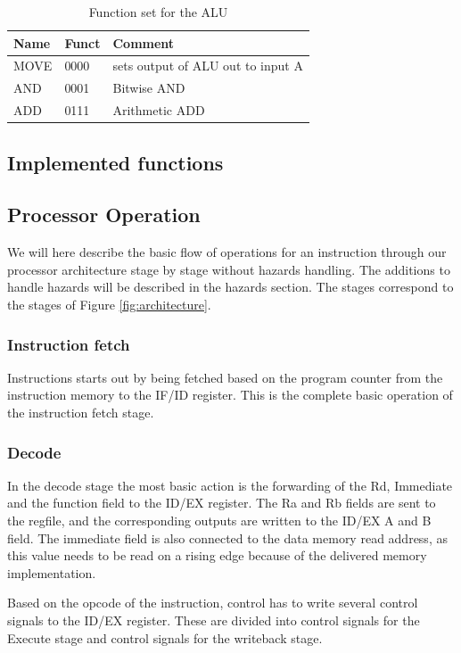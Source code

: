 \documentclass[11pt]{report}
\begin{document}
\begin{table}[h]
  \centering
  \begin{tabular}{|l|l|l|}
    \hline
    Name&Funct&Comment \\
    \hline
    MOVE	&0000	& sets output of ALU out to input A\\
    AND		&0001	& Bitwise AND\\
    ADD		&0111	& Arithmetic ADD\\
    \hline
  \end{tabular}
  \caption{Function set for the ALU}
\end{table}


\subsection*{Implemented functions}
\subsection*{Processor Operation}
We will here describe the basic flow of operations for an instruction
through our processor architecture stage by stage without hazards handling.
The additions to handle hazards will be described in the hazards section.
The stages correspond to the stages of Figure \ref{fig:architecture}.

\subsubsection*{Instruction fetch}


Instructions starts out by being fetched based on the program counter from the
instruction memory to the IF/ID register. This is the complete basic operation of the 
instruction fetch stage.
\subsubsection*{Decode}

In the decode stage the most basic action is the forwarding of the Rd, Immediate and
the function field to the ID/EX register. The Ra and Rb fields are sent to the regfile, 
and the corresponding outputs are written to the ID/EX A and B field. 
The immediate field is also connected to the data memory read address, as this value
needs to be read on a rising edge because of the delivered memory implementation.

Based on the opcode of the instruction, control has to write several control signals 
to the ID/EX register. These are divided into control signals for the Execute stage
and control signals for the writeback stage.
\end{document}
